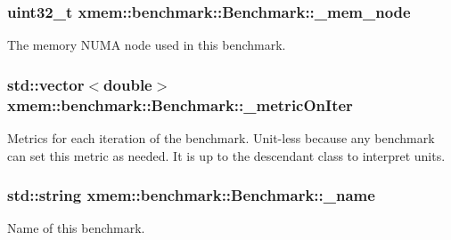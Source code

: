 \subsubsection[{\+\_\+mem\+\_\+node}]{\setlength{\rightskip}{0pt plus 5cm}uint32\+\_\+t xmem\+::benchmark\+::\+Benchmark\+::\+\_\+mem\+\_\+node\hspace{0.3cm}{\ttfamily [protected]}}\label{classxmem_1_1benchmark_1_1_benchmark_a8489553bc6539a9b19db72e9f6ca9a9e}
The memory N\+U\+M\+A node used in this benchmark. \hypertarget{classxmem_1_1benchmark_1_1_benchmark_a1c3ef60ba77f151cc4d5b4b77d2deefa}{}
\subsubsection[{\+\_\+metric\+On\+Iter}]{\setlength{\rightskip}{0pt plus 5cm}std\+::vector$<$double$>$ xmem\+::benchmark\+::\+Benchmark\+::\+\_\+metric\+On\+Iter\hspace{0.3cm}{\ttfamily [protected]}}\label{classxmem_1_1benchmark_1_1_benchmark_a1c3ef60ba77f151cc4d5b4b77d2deefa}
Metrics for each iteration of the benchmark. Unit-\/less because any benchmark can set this metric as needed. It is up to the descendant class to interpret units. \hypertarget{classxmem_1_1benchmark_1_1_benchmark_ab9653ef73e0f1ca01e08286bdb35e4a6}{}
\subsubsection[{\+\_\+name}]{\setlength{\rightskip}{0pt plus 5cm}std\+::string xmem\+::benchmark\+::\+Benchmark\+::\+\_\+name\hspace{0.3cm}{\ttfamily [protected]}}\label{classxmem_1_1benchmark_1_1_benchmark_ab9653ef73e0f1ca01e08286bdb35e4a6}
Name of this benchmark. \hypertarget{classxmem_1_1benchmark_1_1_benchmark_acb55cafc77a1b53ea9910d1be4306970}{}
